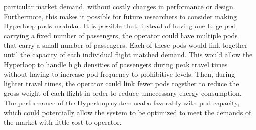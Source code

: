 particular market demand, without costly changes in performance or design.
Furthermore, this makes it possible for future researchers to consider making
Hyperloop pods modular. It is possible that, instead of having one large pod
carrying a fixed number of passengers, the operator could have multiple pods
that carry a small number of passengers. Each of these pods would link together until the capacity
of each individual flight matched demand.
This would allow the Hyperloop to handle high densities of passengers during
peak travel times without having to increase pod frequency to prohibitive levels.
Then, during lighter travel times, the operator could link fewer pods together
to reduce the gross weight of each flight in order to reduce unnecessary energy consumption.
The performance of the Hyperloop system scales favorably with pod capacity,
which could potentially allow the system to be optimized to meet the demands
of the market with little cost to operator.
